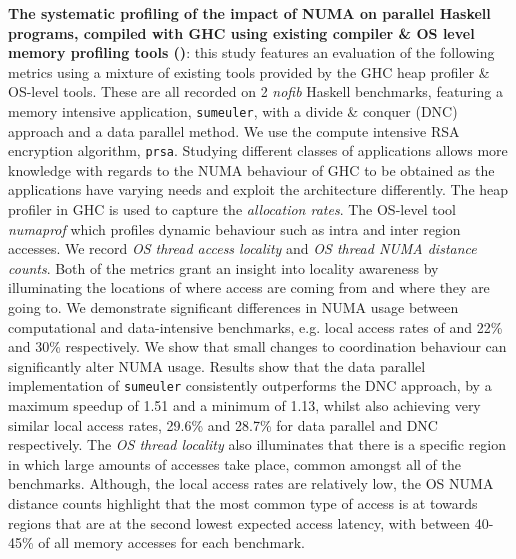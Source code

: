 \documentclass{paper}\usepackage{graphicx}
\begin{document}
\textbf{The systematic profiling of the impact of NUMA on parallel Haskell programs, compiled with GHC using existing compiler \& OS level memory profiling tools ()}: this study features an evaluation of the following metrics using a mixture of existing tools provided by the GHC heap profiler \& OS-level tools. These are all recorded on 2 \textit{nofib} Haskell benchmarks, featuring a memory intensive application, \lstinline{sumeuler}, with a divide \& conquer (DNC) approach and a data parallel method. We use the compute intensive RSA encryption algorithm, \lstinline{prsa}. Studying different classes of applications allows more knowledge with regards to the NUMA behaviour of GHC to be obtained as the applications have varying needs and exploit the architecture differently. The heap profiler in GHC is used to capture the \textit{allocation rates}. The OS-level tool \textit{numaprof} which profiles dynamic behaviour such as intra and inter region accesses. We record \textit{OS thread access locality} and \textit{OS thread NUMA distance counts}. Both of the metrics grant an insight into locality awareness by illuminating the locations of where access are coming from and where they are going to. We demonstrate significant differences in NUMA usage between computational and data-intensive benchmarks, e.g.  local access rates of and 22\% and 30\% respectively. We show that small changes to coordination behaviour can significantly alter NUMA usage.
Results show that the data parallel implementation of \lstinline{sumeuler} consistently outperforms the DNC approach, by a maximum speedup of 1.51 and a minimum of 1.13, whilst also achieving very similar local access rates, 29.6\% and 28.7\% for data parallel and DNC respectively. The \textit{OS thread locality} also illuminates that there is a specific region in which large amounts of accesses take place, common amongst all of the benchmarks. Although, the local access rates are relatively low, the OS NUMA distance counts highlight that the most common type of access is at towards regions that are at the second lowest expected access latency, with between 40-45\% of all memory accesses for each benchmark.

\end{document}
